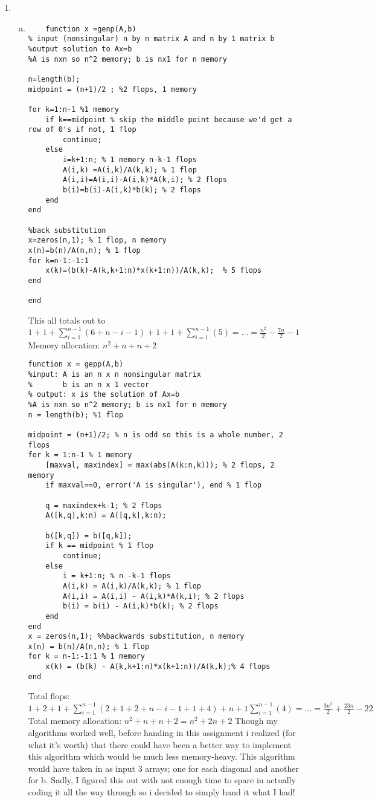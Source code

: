 \begin{enumerate}[1)]
\item
	\begin{enumerate}[(a)]
	\item
	\begin{verbatim}
	function x =genp(A,b)
% input (nonsingular) n by n matrix A and n by 1 matrix b
%output solution to Ax=b
%A is nxn so n^2 memory; b is nx1 for n memory

n=length(b);
midpoint = (n+1)/2 ; %2 flops, 1 memory

for k=1:n-1 %1 memory
    if k==midpoint % skip the middle point because we'd get a row of 0's if not, 1 flop
        continue;
    else
        i=k+1:n; % 1 memory n-k-1 flops
        A(i,k) =A(i,k)/A(k,k); % 1 flop
        A(i,i)=A(i,i)-A(i,k)*A(k,i); % 2 flops
        b(i)=b(i)-A(i,k)*b(k); % 2 flops
    end
end

%back substitution
x=zeros(n,1); % 1 flop, n memory
x(n)=b(n)/A(n,n); % 1 flop
for k=n-1:-1:1 
    x(k)=(b(k)-A(k,k+1:n)*x(k+1:n))/A(k,k);  % 5 flops
end

end
	\end{verbatim}
 This all totals out to 
 $1+1+\sum\limits_{i=1}^{n-1}(6+n-i-1)+1+1+\sum\limits_{i=1}^{n-1}(5)=\dots=\frac{n^2}{2}-\frac{7n}{2}-1$\\
 Memory allocation: 
 $n^2+n+n+2$

	\begin{verbatim}
function x = gepp(A,b)
%input: A is an n x n nonsingular matrix
%       b is an n x 1 vector
% output: x is the solution of Ax=b
%A is nxn so n^2 memory; b is nx1 for n memory
n = length(b); %1 flop

midpoint = (n+1)/2; % n is odd so this is a whole number, 2 flops
for k = 1:n-1 % 1 memory
    [maxval, maxindex] = max(abs(A(k:n,k))); % 2 flops, 2 memory
    if maxval==0, error('A is singular'), end % 1 flop
    
    q = maxindex+k-1; % 2 flops
    A([k,q],k:n) = A([q,k],k:n); 
   
    b([k,q]) = b([q,k]);
    if k == midpoint % 1 flop
        continue;
    else
        i = k+1:n; % n -k-1 flops
        A(i,k) = A(i,k)/A(k,k); % 1 flop
        A(i,i) = A(i,i) - A(i,k)*A(k,i); % 2 flops
        b(i) = b(i) - A(i,k)*b(k); % 2 flops
    end
end
x = zeros(n,1); %%backwards substitution, n memory
x(n) = b(n)/A(n,n); % 1 flop
for k = n-1:-1:1 % 1 memory
    x(k) = (b(k) - A(k,k+1:n)*x(k+1:n))/A(k,k);% 4 flops
end
	\end{verbatim}
Total flops:
$1+2+1+\sum\limits_{i=1}^{n-1}(2+1+2+n-i-1+1+4)+n+1\sum\limits_{i=1}^{n-1}(4)=\dots=\frac{3n^2}{2}+\frac{23n}{2}-22$\\
Total memory allocation: $n^2+n+n+2=n^2+2n+2$
	Though my algorithms worked well, before handing in this assignment i realized (for what it's worth) that there could have been a better way to implement this algorithm which would be much less memory-heavy. This algorithm would have taken in as input $3$ arrays; one for each diagonal and another for b. Sadly, I figured this out with not enough time to spare in actually coding it all the way through so i decided to simply hand it what I had!


\end{enumerate}
\end{enumerate}
